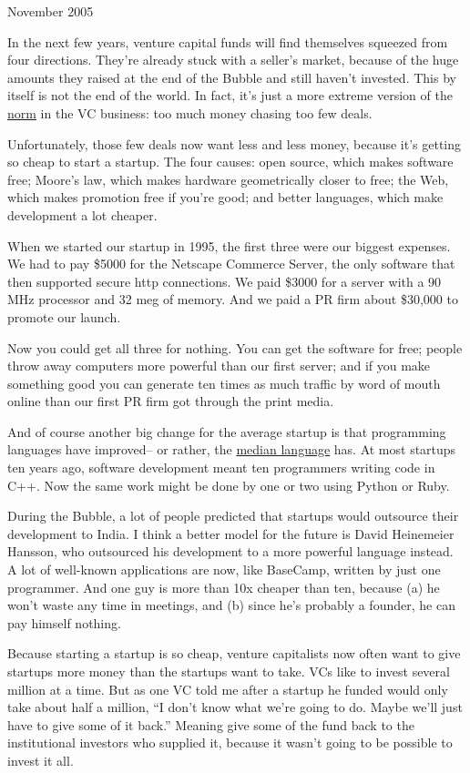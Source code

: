 November 2005

In the next few years, venture capital funds will find themselves
squeezed from four directions. They're already stuck with a seller's
market, because of the huge amounts they raised at the end of the Bubble
and still haven't invested. This by itself is not the end of the world.
In fact, it's just a more extreme version of the
\href{http://www.archub.org/dilbertvc.gif}{norm} in the VC business: too
much money chasing too few deals.

Unfortunately, those few deals now want less and less money, because
it's getting so cheap to start a startup. The four causes: open source,
which makes software free; Moore's law, which makes hardware
geometrically closer to free; the Web, which makes promotion free if
you're good; and better languages, which make development a lot cheaper.

When we started our startup in 1995, the first three were our biggest
expenses. We had to pay \$5000 for the Netscape Commerce Server, the
only software that then supported secure http connections. We paid
\$3000 for a server with a 90 MHz processor and 32 meg of memory. And we
paid a PR firm about \$30,000 to promote our launch.

Now you could get all three for nothing. You can get the software for
free; people throw away computers more powerful than our first server;
and if you make something good you can generate ten times as much
traffic by word of mouth online than our first PR firm got through the
print media.

And of course another big change for the average startup is that
programming languages have improved-- or rather, the
\href{avg.html}{median language} has. At most startups ten years ago,
software development meant ten programmers writing code in C++. Now the
same work might be done by one or two using Python or Ruby.

During the Bubble, a lot of people predicted that startups would
outsource their development to India. I think a better model for the
future is David Heinemeier Hansson, who outsourced his development to a
more powerful language instead. A lot of well-known applications are
now, like BaseCamp, written by just one programmer. And one guy is more
than 10x cheaper than ten, because (a) he won't waste any time in
meetings, and (b) since he's probably a founder, he can pay himself
nothing.

Because starting a startup is so cheap, venture capitalists now often
want to give startups more money than the startups want to take. VCs
like to invest several million at a time. But as one VC told me after a
startup he funded would only take about half a million, ``I don't know
what we're going to do. Maybe we'll just have to give some of it back.''
Meaning give some of the fund back to the institutional investors who
supplied it, because it wasn't going to be possible to invest it all.

